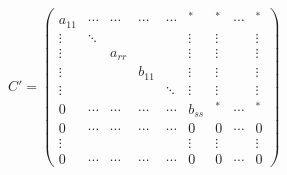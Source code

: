 \documentclass[10pt,fleqn]{article}
\begin{document}
\begin{minipage}{\linewidth}
        \(
            C' = \left(\begin{array}{cccccc|ccc}
                a_{11} & \cdots & \cdots & \cdots & \cdots & ^* & ^* & \cdots & ^*\\
                \vdots & \ddots & & & & \vdots & \vdots & & \vdots\\
                \vdots & & a_{rr} & & & \vdots & \vdots & & \vdots\\
                \vdots & & & b_{11} & & \vdots & \vdots & & \vdots\\
                \vdots & & & & \ddots & \vdots & \vdots & & \vdots\\
                0 & \cdots & \cdots & \cdots & \cdots & b_{ss} & ^* & \cdots & ^*\\
                \hline
                0 & \cdots & \cdots & \cdots & \cdots & 0 & 0 & \cdots & 0\\
                \vdots & & & & & \vdots & \vdots & & \vdots\\
                0 & \cdots & \cdots & \cdots & \cdots & 0 & 0 & \cdots & 0
            \end{array}\right)
        \)
    \end{minipage}
    
\end{document}
